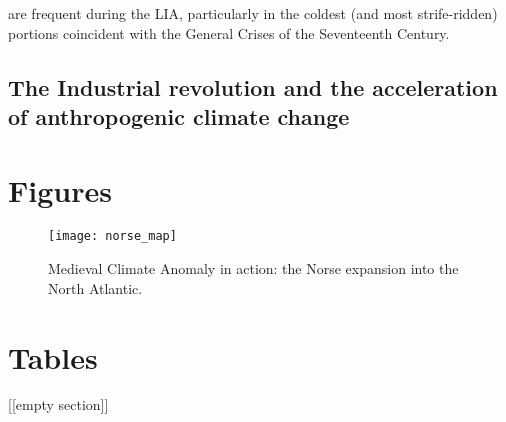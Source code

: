 are frequent during the LIA, particularly in the coldest (and most strife-ridden) portions coincident with the General Crises of the Seventeenth Century.

   
\subsection{The Industrial revolution and the acceleration of anthropogenic climate change}

\clearpage 
\section{Figures} \label{Ice_Ages_Figures}

\begin{figure}
\begin{center}
	\texttt{[image: norse\_map]}%
	\caption{Medieval Climate Anomaly in action: the Norse expansion into the North Atlantic.}
	\label{fig:norse_map}
\end{center}
\end{figure}

\clearpage 
\section{Tables}  \label{Ice_Ages_Tables}

[[empty section]]
